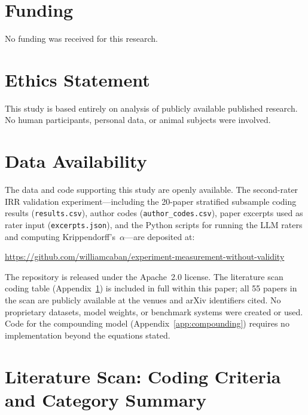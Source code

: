 \documentclass[preprint,12pt]{elsarticle}
\begin{document}
\section*{Funding}

No funding was received for this research.

\section*{Ethics Statement}

This study is based entirely on analysis of publicly available published research.
No human participants, personal data, or animal subjects were involved.

\section*{Data Availability}

The data and code supporting this study are openly available. The second-rater
IRR validation experiment---including the 20-paper stratified subsample coding
results (\texttt{results.csv}), author codes (\texttt{author\_codes.csv}), paper
excerpts used as rater input (\texttt{excerpts.json}), and the Python scripts for
running the LLM raters and computing Krippendorff's~$\alpha$---are deposited at:

\begin{center}
\url{https://github.com/williamcaban/experiment-measurement-without-validity}
\end{center}

The repository is released under the Apache~2.0 license. The literature scan coding
table (Appendix~\ref{app:literature}) is included in full within this paper; all 55
papers in the scan are publicly available at the venues and arXiv identifiers cited.
No proprietary datasets, model weights, or benchmark systems were created or used.
Code for the compounding model (Appendix~\ref{app:compounding}) requires no
implementation beyond the equations stated.




\appendix

\section{Literature Scan: Coding Criteria and Category Summary}
\label{app:literature}
\end{document}
